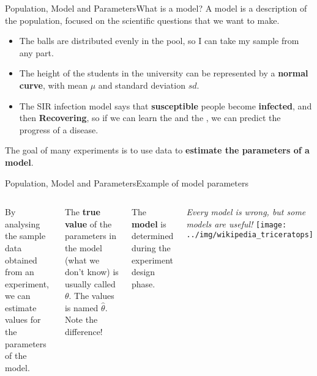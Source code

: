 \begin{frame}{Population, Model and Parameters}{What is a model?}
  A model is a description of the population, focused on the scientific questions that we want to make.\bigskip

  \begin{itemize}
    \item The balls are distributed evenly in the pool, so I can take my sample from any part.
    \item The height of the students in the university can be represented by a {\bf normal curve}, with mean $\mu$ and standard deviation $sd$.
    \item The SIR infection model says that {\bf susceptible} people become {\bf infected}, and then {\bf Recovering}, so if we can learn the  and the , we can predict the progress of a disease.
  \end{itemize}\bigskip

  The goal of many experiments is to use data to {\bf estimate the parameters of a model}.
\end{frame}

\begin{frame}{Population, Model and Parameters}{Example of model parameters}
  \begin{columns}[T]
      By analysing the sample data obtained from an experiment, we can estimate
      values for the parameters of the model.\bigskip

      The {\bf true value} of the parameters in the model (what we don't know) is usually called $\theta$. The values  is named $\hat{\theta}$. Note the difference!\bigskip

      The {\bf model} is determined during the experiment design phase.\medskip

      {\smaller
      \emph{Every model is wrong, but some models are useful!}
      }
    \texttt{[image: ../img/wikipedia\_triceratops]}
  \end{columns}
\end{frame}



